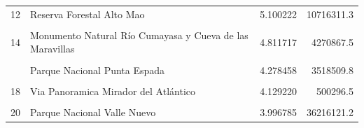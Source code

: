 \documentclass[10pt,landscape,a3paper]{article}
\begin{document}
\begin{table}[H]
\begin{tabular}[t]{llrr}
12 & Reserva Forestal Alto Mao & 5.100222 & 10716311.3\\
\cellcolor{lightgray}{13} & \cellcolor{lightgray}{Refugio de Vida Silvestre Río Chacuey} & \cellcolor{lightgray}{5.098188} & \cellcolor{lightgray}{1976792.9}\\
14 & Monumento Natural Río Cumayasa y Cueva de las Maravillas & 4.811717 & 4270867.5\\
\cellcolor{lightgray}{15} & \cellcolor{lightgray}{Monumento Natural Cabo Samaná} & \cellcolor{lightgray}{4.624415} & \cellcolor{lightgray}{428710.5}\\
\addlinespace
16 & Parque Nacional Punta Espada & 4.278458 & 3518509.8\\
\cellcolor{lightgray}{17} & \cellcolor{lightgray}{Monumento Natural Loma Isabel de Torres} & \cellcolor{lightgray}{4.185139} & \cellcolor{lightgray}{694938.9}\\
18 & Via Panoramica Mirador del Atlántico & 4.129220 & 500296.5\\
\cellcolor{lightgray}{19} & \cellcolor{lightgray}{Parque Nacional Saltos de la Jalda} & \cellcolor{lightgray}{4.004362} & \cellcolor{lightgray}{1458936.7}\\
20 & Parque Nacional Valle Nuevo & 3.996785 & 36216121.2\\
\bottomrule
\end{tabular}
\end{table}
\end{document}
